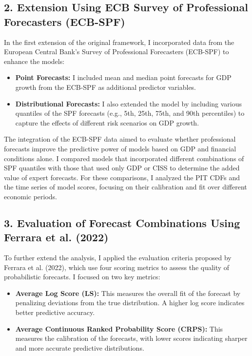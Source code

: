 \documentclass{article}
\begin{document}
\subsection*{2. Extension Using ECB Survey of Professional Forecasters (ECB-SPF)}

In the first extension of the original framework, I incorporated data from the European Central Bank’s Survey of Professional Forecasters (ECB-SPF) to enhance the models:
\begin{itemize}
    \item \textbf{Point Forecasts:} I included mean and median point forecasts for GDP growth from the ECB-SPF as additional predictor variables.
    \item \textbf{Distributional Forecasts:} I also extended the model by including various quantiles of the SPF forecasts (e.g., 5th, 25th, 75th, and 90th percentiles) to capture the effects of different risk scenarios on GDP growth.
\end{itemize}

The integration of the ECB-SPF data aimed to evaluate whether professional forecasts improve the predictive power of models based on GDP and financial conditions alone. I compared models that incorporated different combinations of SPF quantiles with those that used only GDP or CISS to determine the added value of expert forecasts. For these comparisons, I analyzed the PIT CDFs and the time series of model scores, focusing on their calibration and fit over different economic periods.

\subsection*{3. Evaluation of Forecast Combinations Using Ferrara et al. (2022)}

To further extend the analysis, I applied the evaluation criteria proposed by Ferrara et al. (2022), which use four scoring metrics to assess the quality of probabilistic forecasts. I focused on two key metrics:
\begin{itemize}
    \item \textbf{Average Log Score (LS):} This measures the overall fit of the forecast by penalizing deviations from the true distribution. A higher log score indicates better predictive accuracy.
    \item \textbf{Average Continuous Ranked Probability Score (CRPS):} This measures the calibration of the forecasts, with lower scores indicating sharper and more accurate predictive distributions.
\end{itemize}
\end{document}
